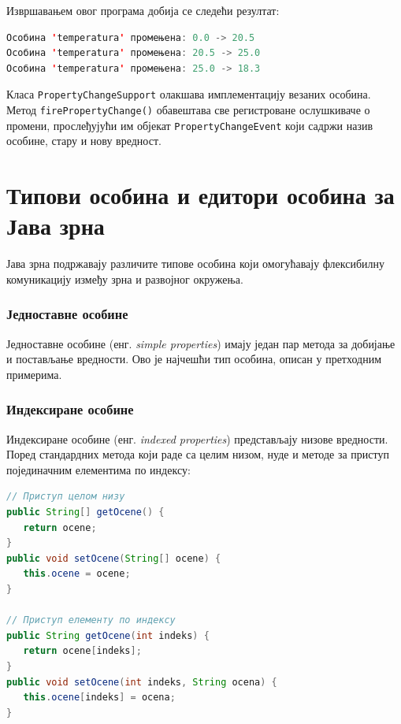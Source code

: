 Извршавањем овог програма добија се следећи резултат:


\begin{lstlisting}[language=Java]
Особина 'temperatura' промењена: 0.0 -> 20.5
Особина 'temperatura' промењена: 20.5 -> 25.0
Особина 'temperatura' промењена: 25.0 -> 18.3
\end{lstlisting}


Класа \texttt{PropertyChangeSupport} олакшава имплементацију везаних особина. Метод \texttt{firePropertyChange()} обавештава све регистроване ослушкиваче о промени, прослеђујући им објекат \texttt{PropertyChangeEvent} који садржи назив особине, стару и нову вредност.


\section{Типови особина и едитори особина за Јава зрна}

Јава зрна подржавају различите типове особина који омогућавају флексибилну комуникацију између зрна и развојног окружења.


\subsubsection{Једноставне особине}

Једноставне особине (енг. \textit{simple properties}) имају један пар метода за добијање и постављање вредности. Ово је најчешћи тип особина, описан у претходним примерима.


\subsubsection{Индексиране особине}

Индексиране особине (енг. \textit{indexed properties}) представљају низове вредности. Поред стандардних метода који раде са целим низом, нуде и методе за приступ појединачним елементима по индексу:


\begin{lstlisting}[language=Java]
// Приступ целом низу
public String[] getOcene() {
   return ocene;
}
public void setOcene(String[] ocene) {
   this.ocene = ocene;
}
 
// Приступ елементу по индексу
public String getOcene(int indeks) {
   return ocene[indeks];
}
public void setOcene(int indeks, String ocena) {
   this.ocene[indeks] = ocena;
}
\end{lstlisting}


